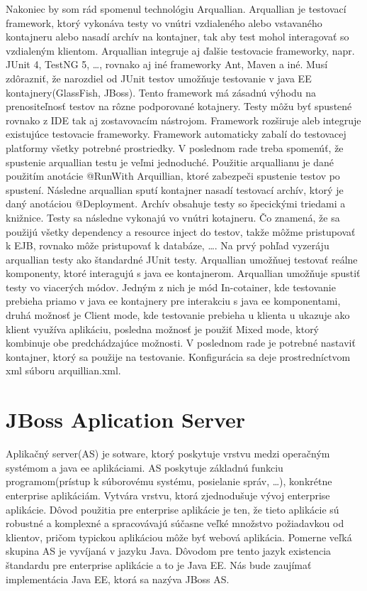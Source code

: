 Nakoniec by som rád spomenul technológiu Arquallian. Arquallian je testovací framework, ktorý vykonáva testy vo vnútri vzdialeného alebo vstavaného kontajneru alebo nasadí archív na kontajner, tak aby test mohol interagovať so vzdialeným klientom. Arquallian integruje aj ďalšie testovacie frameworky, napr. JUnit 4, TestNG 5, \ldots, rovnako aj iné frameworky Ant, Maven a iné. Musí zdôrazniť, že narozdiel od JUnit testov umožňuje testovanie v java EE kontajnery(GlassFish, JBoss)\cite{arqbook}. Tento framework má zásadnú výhodu na prenositeľnosť testov na rôzne podporované kotajnery. Testy môžu byť spustené rovnako z IDE tak aj zostavovacím nástrojom. Framework rozširuje aleb integruje existujúce testovacie frameworky. Framework automaticky zabalí do testovacej platformy všetky potrebné prostriedky. V poslednom rade treba spomenúť, že spustenie arquallian testu je veľmi jednoduché. Použitie arquallianu je dané použitím anotácie @RunWith Arquillian, ktoré zabezpeči spustenie testov po spustení. Následne arquallian sputí kontajner nasadí testovací archív, ktorý je daný anotáciou @Deployment. Archív obsahuje testy so špecickými triedami a knižnice. Testy sa následne vykonajú vo vnútri kotajneru. Čo znamená, že sa použijú všetky dependency a resource inject do testov, takže môžme pristupovať k EJB, rovnako môže pristupovať k databáze, \ldots. Na prvý pohľad vyzeráju arquallian testy ako štandardné JUnit testy. Arquallian umožňuej testovať reálne komponenty, ktoré interagujú s java ee kontajnerom. Arquallian umožňuje spustiť testy vo viacerých módov. Jedným z nich je mód In-cotainer, kde testovanie prebieha priamo v java ee kontajnery pre interakciu s java ee komponentami, druhá možnosť je Client mode, kde testovanie prebieha u klienta u ukazuje ako klient využíva aplikáciu, posledna možnosť je použiť Mixed mode, ktorý kombinuje obe predchádzajúce možnosti. V poslednom rade je potrebné nastaviť kontajner, ktorý sa použije na testovanie. Konfigurácia sa deje prostredníctvom xml súboru arquillian.xml.


\chapter{JBoss Aplication Server}
Aplikačný server(AS) je sotware, ktorý poskytuje vrstvu medzi operačným systémom a java ee aplikáciami. AS poskytuje základnú funkciu programom(prístup k súborovému systému, posielanie správ, \ldots), konkrétne enterprise aplikáciám. Vytvára vrstvu, ktorá zjednodušuje vývoj enterprise aplikácie. Dôvod použitia pre enterprise aplikácie je ten, že tieto aplikácie sú robustné a komplexné a spracovávajú súčasne veľké množstvo požiadavkou od klientov, pričom typickou aplikáciou môže byť webová aplikácia. Pomerne veľká skupina AS je vyvíjaná v jazyku Java. Dôvodom pre tento jazyk existencia štandardu pre enterprise aplikácie a to je Java EE. Nás bude zaujímať implementácia Java EE, ktorá sa nazýva JBoss AS.


